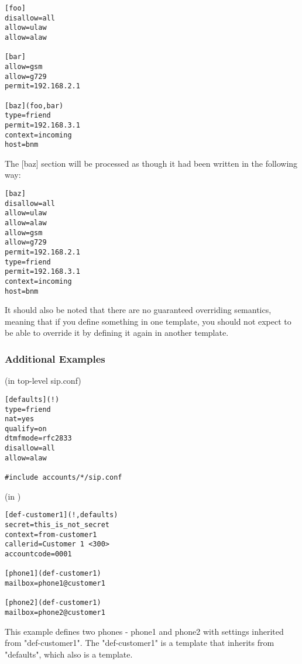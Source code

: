 \begin{astlisting}
\begin{verbatim}
[foo]
disallow=all
allow=ulaw
allow=alaw

[bar]
allow=gsm
allow=g729
permit=192.168.2.1

[baz](foo,bar)
type=friend
permit=192.168.3.1
context=incoming
host=bnm
\end{verbatim}
\end{astlisting}

The [baz] section will be processed as though it had been written in the
following way:

\begin{astlisting}
\begin{verbatim}
[baz]
disallow=all
allow=ulaw
allow=alaw
allow=gsm
allow=g729
permit=192.168.2.1
type=friend
permit=192.168.3.1
context=incoming
host=bnm
\end{verbatim}
\end{astlisting}

It should also be noted that there are no guaranteed overriding semantics, 
meaning that if you define something in one template, you should not expect to
be able to override it by defining it again in another template.

\subsubsection{Additional Examples}

(in top-level sip.conf)

\begin{astlisting}
\begin{verbatim}
[defaults](!)
type=friend
nat=yes
qualify=on
dtmfmode=rfc2833
disallow=all
allow=alaw

#include accounts/*/sip.conf
\end{verbatim}
\end{astlisting}

(in )

\begin{astlisting}
\begin{verbatim}
[def-customer1](!,defaults)
secret=this_is_not_secret
context=from-customer1
callerid=Customer 1 <300>
accountcode=0001

[phone1](def-customer1)
mailbox=phone1@customer1

[phone2](def-customer1)
mailbox=phone2@customer1
\end{verbatim}
\end{astlisting}

This example defines two phones - phone1 and phone2 with settings
inherited from "def-customer1".  The "def-customer1" is a template that
inherits from "defaults", which also is a template.
